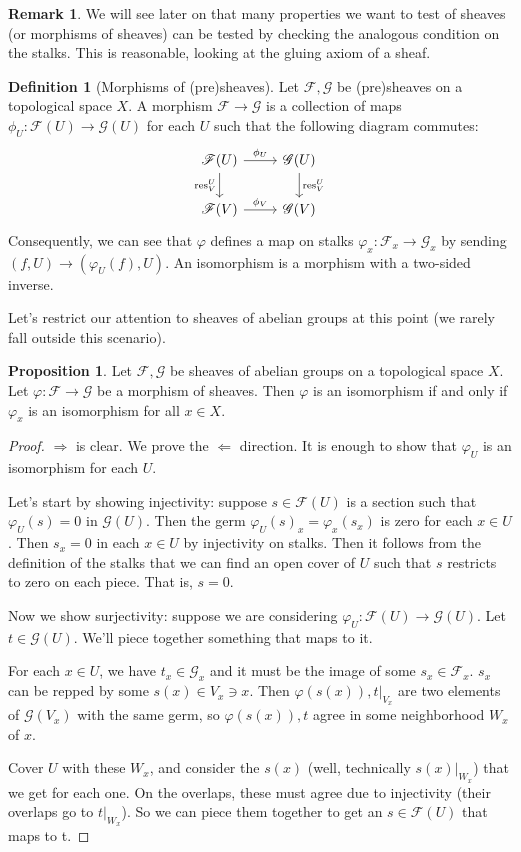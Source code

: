 \documentclass[10pt,reqno]{amsart}
\theoremstyle{definition}
\newtheorem{definition}[theorem]{Definition}
\newtheorem{proposition}[theorem]{Proposition}
\newtheorem{remark}[theorem]{Remark}
\theoremstyle{remark}
\numberwithin{equation}{section}
\numberwithin{theorem}{section}
\newcommand{\res}{\textup{res}}
\newcommand{\FF}{{\mathscr F}}
\newcommand{\GG}{{\mathscr G}}
\begin{document}
\begin{remark} We will see later on that many properties we want to test of sheaves (or morphisms of sheaves) can be tested by checking the analogous condition on the stalks. This is reasonable, looking at the gluing axiom of a sheaf.
\end{remark}

\begin{definition}[Morphisms of (pre)sheaves] Let $\FF,\GG$ be (pre)sheaves on a topological space $X$. A morphism $\FF \to \GG$ is a collection of maps $\phi_U: \FF(U) \to \GG(U)$ for each $U$ such that the following diagram commutes:
\[\begin{tikzcd}
\FF(U) \arrow[r, "\phi_U"] \arrow[d, swap, "\res^U_V"]& \GG(U) \arrow[d, "\res^U_V"]\\
\FF(V) \arrow[r,"\phi_V"]& \GG(V)
\end{tikzcd}\]
Consequently, we can see that $\varphi$ defines a map on stalks $\varphi_x: \FF_x \to \GG_x$ by sending $(f,U) \to (\varphi_U(f),U)$. An isomorphism is a morphism with a two-sided inverse.
\end{definition}

Let's restrict our attention to sheaves of abelian groups at this point (we rarely fall outside this scenario).

\begin{proposition} Let $\FF,\GG$ be sheaves of abelian groups on a topological space $X$. Let $\varphi: \FF \to \GG$ be a morphism of sheaves. Then $\varphi$ is an isomorphism if and only if $\varphi_x$ is an isomorphism for all $x \in X$.
\end{proposition}
\begin{proof}\text{ }
$\Rightarrow$ is clear. We prove the $\Leftarrow$ direction. It is enough to show that $\varphi_U$ is an isomorphism for each $U$.

Let's start by showing injectivity: suppose $s \in \FF(U)$ is a section such that $\varphi_U(s) = 0$ in $\GG(U)$.  Then the germ $\varphi_U(s)_x = \varphi_x(s_x)$ is zero for each $x \in U$. Then $s_x = 0$ in each $x \in U$ by injectivity on stalks. Then it follows from the definition of the stalks that we can find an open cover of $U$ such that $s$ restricts to zero on each piece. That is, $s=0$.

Now we show surjectivity: suppose we are considering $\varphi_U : \FF(U) \to \GG(U)$. Let $t \in \GG(U)$. We'll piece together something that maps to it.

For each $x \in U$, we have $t_x \in \GG_x$ and it must be the image of some $s_x \in \FF_x$. $s_x$ can be repped by some $s(x) \in V_x \ni x$. Then $\varphi(s(x)), t|_{V_x}$ are two elements of $\GG(V_x)$ with the same germ, so $\varphi(s(x)), t$ agree in some neighborhood $W_x$ of $x$.

Cover $U$ with these $W_x$, and consider the $s(x)$ (well, technically $s(x)|_{W_x}$) that we get for each one. On the overlaps, these must agree due to injectivity (their overlaps go to $t|_{W_x}$). So we can piece them together to get an $s \in \FF(U)$ that maps to t.
\end{proof}
\end{document}
